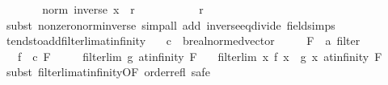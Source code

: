 \begin{isabellebody}
\ \ \ \ \isamarkupfalse%
\ \isamarkupfalse%
\ {\isachardoublequoteopen}norm\ {\isacharparenleft}{\kern0pt}inverse\ x{\isacharparenright}{\kern0pt}\ {\isacharless}{\kern0pt}\ r{\isachardoublequoteclose}\isanewline
\ \ \ \ \ \ \isamarkupfalse%
\ {\isacharasterisk}{\kern0pt}\ {\isacartoucheopen}{}\ {\isacharless}{\kern0pt}\ r{\isacartoucheclose}\isanewline
\ \ \ \ \ \ \isamarkupfalse%
\ {\isacharparenleft}{\kern0pt}subst\ nonzero{\isacharunderscore}{\kern0pt}norm{\isacharunderscore}{\kern0pt}inverse{\isacharparenright}{\kern0pt}\ {\isacharparenleft}{\kern0pt}simp{\isacharunderscore}{\kern0pt}all\ add{\isacharcolon}{\kern0pt}\ inverse{\isacharunderscore}{\kern0pt}eq{\isacharunderscore}{\kern0pt}divide\ field{\isacharunderscore}{\kern0pt}simps{\isacharparenright}{\kern0pt}\isanewline
\ \ \isamarkupfalse%
\isanewline
{}\isamarkupfalse%
%
\endisatagproof
{\isafoldproof}%
%
\isadelimproof
\isanewline
%
\endisadelimproof
\isanewline
{}\isamarkupfalse%
\ tendsto{\isacharunderscore}{\kern0pt}add{\isacharunderscore}{\kern0pt}filterlim{\isacharunderscore}{\kern0pt}at{\isacharunderscore}{\kern0pt}infinity{\isacharcolon}{\kern0pt}\isanewline
\ \ \ c\ {\isacharcolon}{\kern0pt}{\isacharcolon}{\kern0pt}\ {\isachardoublequoteopen}{\isacharprime}{\kern0pt}b{\isacharcolon}{\kern0pt}{\isacharcolon}{\kern0pt}real{\isacharunderscore}{\kern0pt}normed{\isacharunderscore}{\kern0pt}vector{\isachardoublequoteclose}\isanewline
\ \ \ \ \ F\ {\isacharcolon}{\kern0pt}{\isacharcolon}{\kern0pt}\ {\isachardoublequoteopen}{\isacharprime}{\kern0pt}a\ filter{\isachardoublequoteclose}\isanewline
\ \ \ {\isachardoublequoteopen}{\isacharparenleft}{\kern0pt}f\ {\isasymlonglongrightarrow}\ c{\isacharparenright}{\kern0pt}\ F{\isachardoublequoteclose}\isanewline
\ \ \ \ \ {\isachardoublequoteopen}filterlim\ g\ at{\isacharunderscore}{\kern0pt}infinity\ F{\isachardoublequoteclose}\isanewline
\ \ \ {\isachardoublequoteopen}filterlim\ {\isacharparenleft}{\kern0pt}{\isasymlambda}x{\isachardot}{\kern0pt}\ f\ x\ {\isacharplus}{\kern0pt}\ g\ x{\isacharparenright}{\kern0pt}\ at{\isacharunderscore}{\kern0pt}infinity\ F{\isachardoublequoteclose}\isanewline
%
\isadelimproof
%
\endisadelimproof
%
\isatagproof
{}\isamarkupfalse%
\ {\isacharparenleft}{\kern0pt}subst\ filterlim{\isacharunderscore}{\kern0pt}at{\isacharunderscore}{\kern0pt}infinity{\isacharbrackleft}{\kern0pt}OF\ order{\isacharunderscore}{\kern0pt}refl{\isacharbrackright}{\kern0pt}{\isacharcomma}{\kern0pt}\ safe{\isacharparenright}{\kern0pt}\isanewline

\end{isabellebody}
